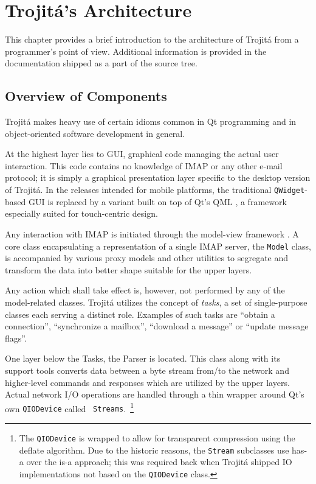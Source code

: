 \documentclass[trojita]{subfiles}
\begin{document}
\chapter{Trojitá's Architecture}

This chapter provides a brief introduction to the architecture of Trojitá from a programmer's point of view.  Additional
information is provided in the documentation shipped as a part of the source tree.

\section{Overview of Components}

Trojitá makes heavy use of certain idioms common in Qt programming and in object-oriented software development in
general.

At the highest layer lies to GUI, graphical code managing the actual user interaction.  This code contains no knowledge
of IMAP or any other e-mail protocol; it is simply a graphical presentation layer specific to the desktop version of
Trojitá.  In the releases intended for mobile platforms, the traditional {\tt QWidget}-based GUI is replaced by a
variant built on top of Qt's QML \cite{qml}, a framework especially suited for touch-centric design.

Any interaction with IMAP is initiated through the model-view framework \cite{qt-mvc}.  A core class encapsulating a
representation of a single IMAP server, the {\tt Model} class, is accompanied by various proxy models and other
utilities to segregate and transform the data into better shape suitable for the upper layers.

Any action which shall take effect is, however, not performed by any of the model-related classes.  Trojitá utilizes the
concept of {\em tasks}, a set of single-purpose classes each serving a distinct role.  Examples of such tasks are
``obtain a connection'', ``synchronize a mailbox'', ``download a message'' or ``update message flags''.

One layer below the Tasks, the Parser is located.  This class along with its support tools converts data between a
byte stream from/to the network and higher-level commands and responses which are utilized by the upper
layers.  Actual network I/O operations are handled through a thin wrapper around Qt's own {\tt QIODevice} called {\tt
Streams}.~\footnote{The {\tt QIODevice} is wrapped to allow for transparent compression using the deflate algorithm.  Due
to the historic reasons, the {\tt Stream} subclasses use has-a over the is-a approach; this was required back when
Trojitá shipped IO implementations not based on the {\tt QIODevice} class.}
\end{document}
